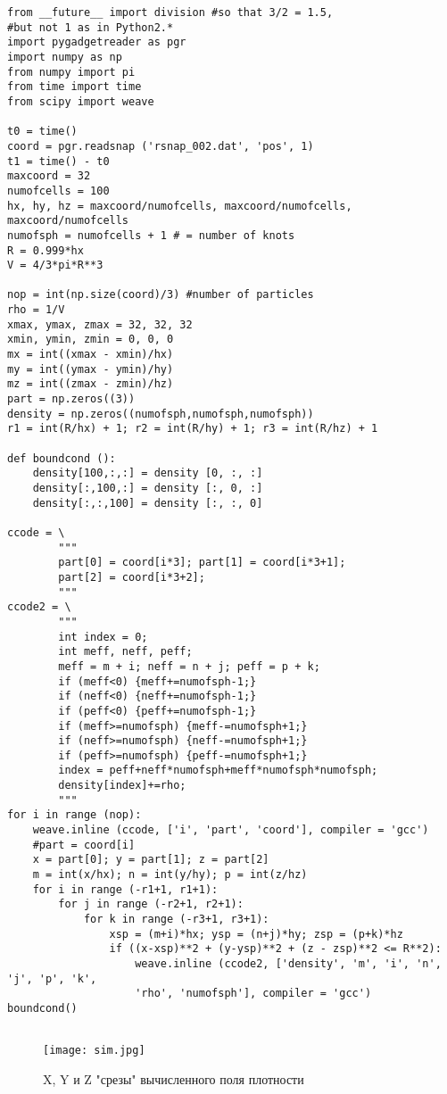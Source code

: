 \documentclass[11pt]{article}
\begin{document}
\begin{lstlisting}
from __future__ import division #so that 3/2 = 1.5, 
#but not 1 as in Python2.* 
import pygadgetreader as pgr
import numpy as np
from numpy import pi
from time import time
from scipy import weave

t0 = time()
coord = pgr.readsnap ('rsnap_002.dat', 'pos', 1) 
t1 = time() - t0
maxcoord = 32
numofcells = 100
hx, hy, hz = maxcoord/numofcells, maxcoord/numofcells, maxcoord/numofcells
numofsph = numofcells + 1 # = number of knots
R = 0.999*hx
V = 4/3*pi*R**3 

nop = int(np.size(coord)/3) #number of particles
rho = 1/V
xmax, ymax, zmax = 32, 32, 32
xmin, ymin, zmin = 0, 0, 0
mx = int((xmax - xmin)/hx)
my = int((ymax - ymin)/hy)
mz = int((zmax - zmin)/hz)
part = np.zeros((3))
density = np.zeros((numofsph,numofsph,numofsph))
r1 = int(R/hx) + 1; r2 = int(R/hy) + 1; r3 = int(R/hz) + 1

def boundcond ():
    density[100,:,:] = density [0, :, :]
    density[:,100,:] = density [:, 0, :]
    density[:,:,100] = density [:, :, 0]

ccode = \
        """
        part[0] = coord[i*3]; part[1] = coord[i*3+1];
        part[2] = coord[i*3+2];
        """
ccode2 = \
        """
        int index = 0;
        int meff, neff, peff;
        meff = m + i; neff = n + j; peff = p + k;
        if (meff<0) {meff+=numofsph-1;}
        if (neff<0) {neff+=numofsph-1;}
        if (peff<0) {peff+=numofsph-1;}
        if (meff>=numofsph) {meff-=numofsph+1;}
        if (neff>=numofsph) {neff-=numofsph+1;}
        if (peff>=numofsph) {peff-=numofsph+1;}
        index = peff+neff*numofsph+meff*numofsph*numofsph;
        density[index]+=rho;
        """
for i in range (nop):
    weave.inline (ccode, ['i', 'part', 'coord'], compiler = 'gcc')
    #part = coord[i]
    x = part[0]; y = part[1]; z = part[2]    
    m = int(x/hx); n = int(y/hy); p = int(z/hz)
    for i in range (-r1+1, r1+1):
        for j in range (-r2+1, r2+1):
            for k in range (-r3+1, r3+1):
                xsp = (m+i)*hx; ysp = (n+j)*hy; zsp = (p+k)*hz
                if ((x-xsp)**2 + (y-ysp)**2 + (z - zsp)**2 <= R**2):
                    weave.inline (ccode2, ['density', 'm', 'i', 'n', 'j', 'p', 'k', 
                    'rho', 'numofsph'], compiler = 'gcc')                    
boundcond()
     
\end{lstlisting}
\begin{figure}[H]
\centering
\texttt{[image: sim.jpg]}
\caption{X, Y и Z "срезы" вычисленного поля плотности}  
\end{figure}
\end{document}
